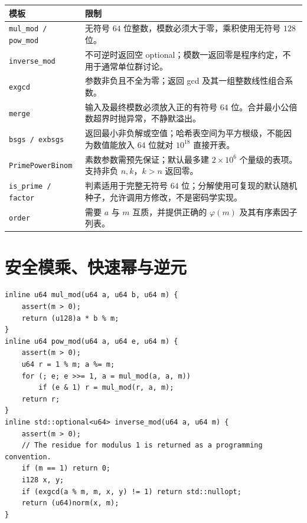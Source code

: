 \documentclass[UTF8,a4paper,11pt,twoside,openright,fontset=fandol]{ctexbook}
\theoremstyle{definition}
\begin{document}
\begin{longtable}{p{}p{}}
\toprule
模板 & 限制\\\midrule
\texttt{mul\_mod / pow\_mod} & 无符号 $64$ 位整数，模数必须大于零，乘积使用无符号 $128$ 位。\\
\texttt{inverse\_mod} & 不可逆时返回空 optional；模数一返回零是程序约定，不用于通常单位群讨论。\\
\texttt{exgcd} & 参数非负且不全为零；返回 gcd 及其一组整数线性组合系数。\\
\texttt{merge} & 输入及最终模数必须放入正的有符号 $64$ 位。合并最小公倍数超界时抛异常，不静默溢出。\\
\texttt{bsgs / exbsgs} & 返回最小非负解或空值；哈希表空间为平方根级，不能因为数值能放入 $64$ 位就对 $10^{18}$ 直接开表。\\
\texttt{PrimePowerBinom} & 素数参数需预先保证；默认最多建 $2\times10^6$ 个量级的表项。支持非负 $n,k$，$k>n$ 返回零。\\
\texttt{is\_prime / factor} & 判素适用于完整无符号 $64$ 位；分解使用可复现的默认随机种子，允许调用方修改，不是密码学实现。\\
\texttt{order} & 需要 $a$ 与 $m$ 互质，并提供正确的 $\varphi(m)$ 及其有序素因子列表。\\
\bottomrule
\end{longtable}

\section{安全模乘、快速幂与逆元}
\begin{lstlisting}
inline u64 mul_mod(u64 a, u64 b, u64 m) {
    assert(m > 0);
    return (u128)a * b % m;
}
inline u64 pow_mod(u64 a, u64 e, u64 m) {
    assert(m > 0);
    u64 r = 1 % m; a %= m;
    for (; e; e >>= 1, a = mul_mod(a, a, m))
        if (e & 1) r = mul_mod(r, a, m);
    return r;
}
inline std::optional<u64> inverse_mod(u64 a, u64 m) {
    assert(m > 0);
    // The residue for modulus 1 is returned as a programming convention.
    if (m == 1) return 0;
    i128 x, y;
    if (exgcd(a % m, m, x, y) != 1) return std::nullopt;
    return (u64)norm(x, m);
}
\end{lstlisting}
\end{document}
